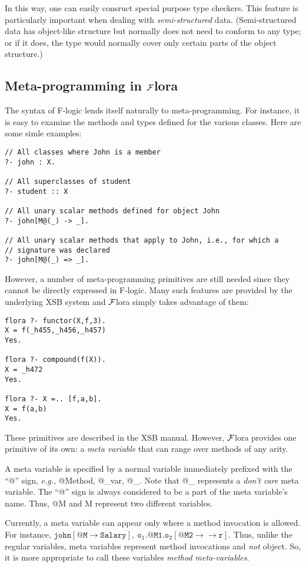 \documentclass[11pt]{article}
\newcommand{\fd}{\ensuremath{{\rightarrow}}}                   %
\newcommand{\mvd}{\ensuremath{{\rightarrow\!\!\!\!\rightarrow}}}  %
\newcommand{\FLORA}{{\mbox{${\cal F}${\sc lora}}}\xspace}
\newcommand{\fl}{{F-logic}\xspace}
\begin{document}
In this way, one can easily consruct special purpose type checkers.  This
feature is particularly important when dealing with \emph{semi-structured}
data. (Semi-structured data has object-like structure but normally does not
need to conform to any type; or if it does, the type would normally cover
only certain parts of the object structure.)

\subsection{Meta-programming in \FLORA}

The syntax of \fl lends itself naturally to meta-programming. For instance,
it is easy to examine the methods and types defined for the various classes.
Here are some simle examples:
\begin{verbatim}
// All classes where John is a member
?- john : X.  

// All superclasses of student
?- student :: X

// All unary scalar methods defined for object John
?- john[M@(_) -> _].

// All unary scalar methods that apply to John, i.e., for which a
// signature was declared
?- john[M@(_) => _].
\end{verbatim}
However, a number of meta-programming primitives are still needed
since they cannot be directly expressed in \fl. Many such features are
provided by the underlying XSB system and \FLORA simply takes advantage of
them: 
\begin{verbatim}
flora ?- functor(X,f,3).
X = f(_h455,_h456,_h457)
Yes.

flora ?- compound(f(X)).
X = _h472
Yes.

flora ?- X =.. [f,a,b].
X = f(a,b)
Yes.
\end{verbatim}
These primitives are described in the XSB manual. However, \FLORA provides
one primitive of its own: a {\em meta variable\/} that can range over methods of
any arity.

A meta variable is specified by a normal variable immediately prefixed with
the ``@'' sign, {\it e.g.}, @Method, @\_var, @\_. Note that @\_ represents
a \emph{don't care} meta variable. The ``@'' sign is always considered to
be a part of the meta variable's name.  Thus, @M and M represent two
different variables.

Currently, a meta variable can appear only where a method invocation is
allowed. For instance, $\mathtt{john[@M{\fd}Salary],~
  o_1.@M1.o_2[@M2{\mvd}r]}$. Thus, unlike the regular variables, meta
variables represent method invocations and \emph{not} object.  So, it is
more appropriate to call these variables \emph{method meta-variables}.
\end{document}
